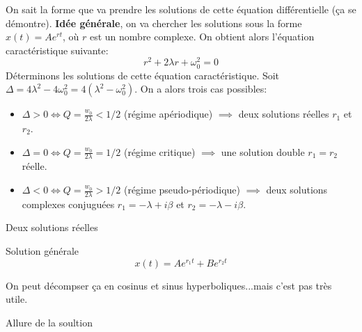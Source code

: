 \documentclass{beamer}
\begin{document}
    \begin{frame}
        On sait la forme que va prendre les solutions de cette équation différentielle (ça se démontre). 
        \textbf{Idée générale}, on va chercher les solutions sous la forme $x(t) = A e^{rt}$, où $r$ est un nombre complexe. On obtient alors l'équation caractéristique suivante:
        \begin{equation}
            r^2 + 2\lambda r + \omega_0^2 = 0
        \end{equation}
        Déterminons les solutions de cette équation caractéristique. Soit $\Delta = 4\lambda^2 - 4\omega_0^2 = 4(\lambda^2 - \omega_0^2)$. On a alors trois cas possibles:\begin{itemize}
            \item $\Delta > 0 \iff Q = \frac{w_0}{2\lambda} < 1/2$ (régime apériodique) $\implies$ deux solutions réelles $r_1$ et $r_2$.
            \item $\Delta = 0 \iff Q = \frac{w_0}{2\lambda} = 1/2$ (régime critique) $\implies$ une solution double $r_1 = r_2$ réelle.
            \item $\Delta < 0 \iff Q = \frac{w_0}{2\lambda} > 1/2$ (régime pseudo-périodique) $\implies$ deux solutions complexes conjuguées $r_1 = -\lambda + i \beta$ et $r_2 = -\lambda - i \beta$.
        \end{itemize}
    \end{frame}
    \begin{frame}{Deux solutions réelles}
        \begin{block}{Solution générale}
            \begin{equation}
                x(t) = A e^{r_1 t} + B e^{r_2 t}
            \end{equation}
        \end{block}
        On peut décompser ça en cosinus et sinus hyperboliques...mais c'est pas très utile.
        \begin{block}{Allure de la soultion}
        \end{block}
    \end{frame}
\end{document}
